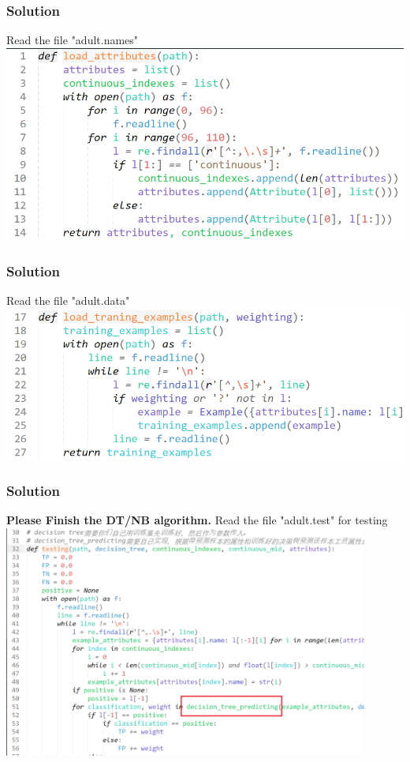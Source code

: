\documentclass{beamer}
\begin{document}
\begin{frame}
  \frametitle{Solution}
      Read the file "adult.names"
      \\[10pt]
      \includegraphics[width=1.0\textwidth]{Pic/input1}


\end{frame}

\begin{frame}
  \frametitle{Solution}

      Read the file "adult.data"
      \\[10pt]
      \includegraphics[width=1.0\textwidth]{Pic/input2}

\end{frame}

\begin{frame}
  \frametitle{Solution}
	  \textbf{Please Finish the DT/NB algorithm.}
      Read the file "adult.test" for testing
      \\[10pt]
      \includegraphics[width=0.9\textwidth]{Pic/output}

\end{frame}
\end{document}
